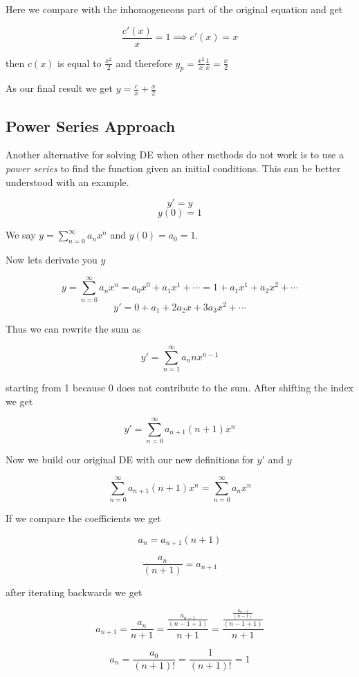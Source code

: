 Here we compare with the inhomogeneous part of the original equation and get

\[
\frac{c'(x)}{x} = 1 \implies c'(x) = x
\]

then \(c(x)\) is equal to \(\frac{x^2}{2}\) and therefore \(y_p = \frac{x^2}{x}\frac{1}{x} = \frac{x}{2}\)
\vspace{\baselineskip}

As our final result we get \(y = \frac{c}{x} + \frac{x}{2}\)

\subsection{Power Series Approach}

Another alternative for solving DE when other methods do not work is to use a \emph{power series} 
to find the function given an initial conditions. This can be better understood with an example.

\[y' = y\]
\[y(0) = 1\]

We say \(y = \sum_{n = 0}^{\infty} a_n x^n\) and \(y(0) = a_0 = 1\).

Now lets derivate you \(y\)

\[
y = \sum_{n = 0}^{\infty} a_n x^n = a_0 x^0 + a_1 x^1 + \cdots = 1 + a_1 x^1 + a_2 x^2 + \cdots
\]
\[
y' = 0  + a_1 + 2 a_2 x + 3 a_3 x^2 + \cdots 
\]

Thus we can rewrite the sum as 

\[
y' = \sum_{n = 1}^{\infty} a_n n x^{n - 1}
\]

starting from 1 because 0 does not contribute to the sum. After shifting the index we get

\[
y' = \sum_{n = 0}^{\infty} a_{n + 1}(n + 1)x^{n}
\]

Now we build our original DE with our new definitions for \(y'\) and \(y\)

\[
\sum_{n = 0}^{\infty} a_{n + 1}(n + 1)x^{n} = \sum_{n = 0}^{\infty} a_n x^n
\]

If we compare the coefficients we get

\[
a_n = a_{n+1}(n+1)
\]

\[
\frac{a_n}{(n + 1)} = a_{n+1}
\]


after iterating backwards we get

\[
a_{n + 1} = \frac{a_n}{n + 1} = \frac{\frac{a_{n - 1}}{(n - 1 +1)}}{n + 1} = \frac{\frac{\frac{a_{n - 2}}{(n - 1)}}{(n - 1 + 1)}}{n + 1}   
\]

\[
a_n = \frac{a_0}{(n + 1)!} = \frac{1}{(n + 1)!} = 1
\]

